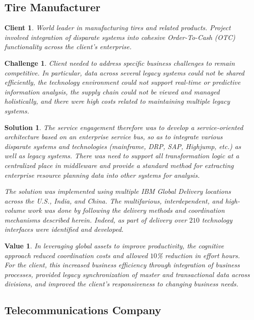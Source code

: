 \documentclass[10pt,journal,cspaper,compsoc]{IEEEtran}
\newtheorem{client}{Client}
\newtheorem{challenge}{Challenge}
\newtheorem{solution}{Solution}
\newtheorem{val}{Value}
\begin{document}
\subsection{Tire Manufacturer}
\begin{client}
World leader in manufacturing tires and related products. Project involved integration of disparate systems into cohesive 
Order-To-Cash (OTC) functionality across the client's enterprise. 
\end{client}
\begin{challenge}
Client needed to address specific business challenges to remain competitive.  In particular,
data across several legacy systems could not be shared efficiently, the technology environment could 
not support real-time or predictive information analysis, the supply chain could not be viewed 
and managed holistically, and there were high costs related to maintaining multiple legacy systems.
\end{challenge}
\begin{solution}
The service engagement therefore was to develop a service-oriented architecture based on an enterprise service bus,
so as to integrate various disparate systems and technologies (mainframe, DRP, SAP, Highjump, etc.) as well as 
legacy systems.  There was need to support all transformation logic at a centralized place in middleware 
and provide a standard method for extracting enterprise resource planning data into other systems for analysis. 

The solution was implemented using multiple IBM Global Delivery locations across the U.S., India, and China.
The multifarious, interdependent, and high-volume work was done by following the delivery methods and coordination 
mechanisms described herein.  Indeed, as part of delivery over $210$ technology interfaces were identified and 
developed. 
\end{solution}
\begin{val}
In leveraging global assets to improve productivity, the cognitive approach reduced coordination costs and allowed 
$10$\% reduction in effort hours.  For the client, this increased business efficiency through integration of business processes,
provided legacy synchronization of master and transactional data across divisions, and improved the client's
responsiveness to changing business needs.
\end{val}

\subsection{Telecommunications Company}
\end{document}

